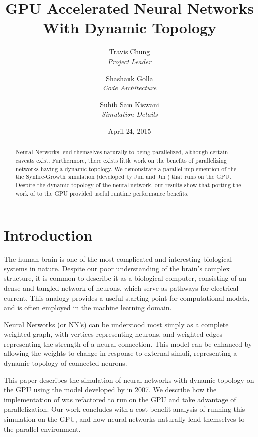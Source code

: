 \documentclass[a4paper]{article}
\title{GPU Accelerated Neural Networks With Dynamic Topology}
\author{Travis Chung\\ \emph{Project Leader}
    \and Shashank Golla\\ \emph{Code Architecture}
    \and Suhib Sam Kiswani\\\emph{Simulation Details}
}
\date{April 24, 2015}
\begin{document}
\listoftodos %

\maketitle

\begin{abstract}
Neural Networks lend themselves naturally to being parallelized, although certain caveats exist. Furthermore, there exists little work on the benefits of parallelizing networks having a dynamic topology. We demonstrate a parallel implemention of the the Synfire-Growth simulation (developed by Jun and Jin \cite{synfire}) that runs on the GPU. Despite the dynamic topology of the neural network, our results show that porting the work of \cite{synfire} to the GPU provided useful runtime performance benefits.
\end{abstract}


\section{Introduction}
The human brain is one of the most complicated and interesting biological systems in nature. Despite our poor understanding of the brain's complex structure, it is common to describe it as a biological computer, consisting of an dense and tangled network of neurons, which serve as pathways for electrical current. This analogy provides a useful starting point for computational models, and is often employed in the machine learning domain.

Neural Networks (or NN's) can be understood most simply as a complete weighted graph, with vertices representing neurons, and weighted edges representing the strength of a neural connection. This model can be enhanced by allowing the weights to change in response to external simuli, representing a dynamic topology of connected neurons.


This paper describes the simulation of neural networks with dynamic topology on the GPU using the model developed by \cite{synfire} in 2007. We describe how the implementation of \cite{synfire} was refactored to run on the GPU and take advantage of parallelization. Our work concludes with a cost-benefit analysis of running this simulation on the GPU, and how neural networks naturally lend themselves to the parallel environment.
\end{document}
